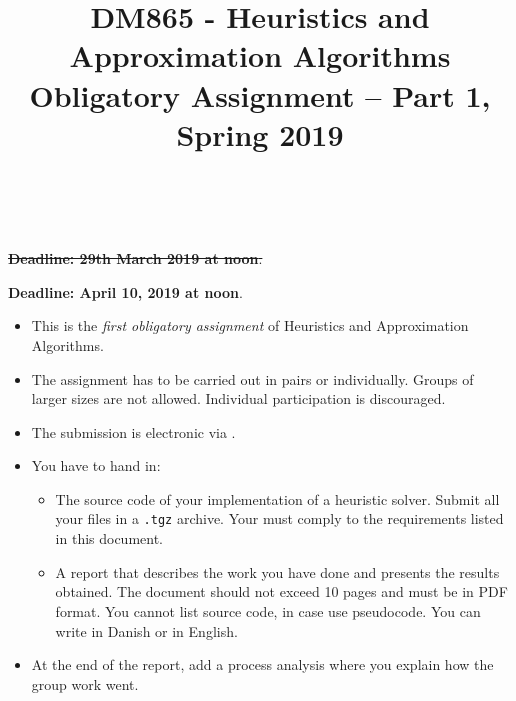 \documentclass[a4paper,10pt]{article}
\title{\begin{flushleft}
DM865 - Heuristics and Approximation Algorithms\\[0.3cm]
{\Large Obligatory Assignment -- Part 1, Spring 2019 %
}
\\
\hrulefill
\\[-1.8cm]
\end{flushleft}
}
\author{}
\date{}
\begin{document}
\maketitle

\begin{center}
  \sout{\textbf{Deadline: 29th March 2019 at noon}.}
  
\color{blue}\textbf{Deadline: April 10, 2019 at noon}.\color{black}
\end{center}
\bigskip



\begin{itemize}

\item This is the \emph{first obligatory assignment} of Heuristics and
  Approximation Algorithms. %

  
\item The assignment has to be carried out in pairs or
  individually. Groups of larger sizes are not allowed. Individual
  participation is discouraged.

\item The submission is electronic via
  .

\item  You have to hand in:
  \begin{itemize}
  \item The source code of your implementation of a heuristic
    solver. Submit all your files in a \lstinline{.tgz} archive. Your
    must comply to the requirements listed in this document.
    
  \item A report that describes the work you have done and presents the
    results obtained. The document should not exceed 10 pages and must
    be in PDF format. You cannot list source code, in case use
    pseudocode. You can write in Danish or in English.
  \end{itemize} 

\item At the end of the report, add a process analysis where you
  explain how the group work went.
  
%


\end{itemize}
\end{document}
